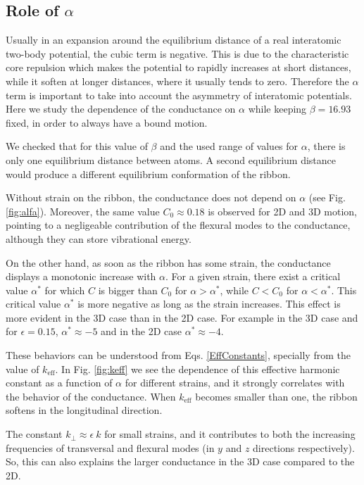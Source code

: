 \documentclass[12pt]{article}
\begin{document}
\subsection*{\textbf{Role of $\alpha$}}

Usually in an expansion around the equilibrium distance of a real interatomic two-body potential, the cubic term is negative. This is due to the characteristic core repulsion which makes the potential to rapidly increases at short distances, while it soften at longer distances, where it usually tends to zero. Therefore the $\alpha$ term is important to take into account the asymmetry of interatomic potentials. Here we study the dependence of the conductance on $\alpha$ while keeping $\beta = 16.93$ fixed, in order to always have a bound motion.

We checked that for this value of $\beta$ and the used range of values for $\alpha$, there is only one equilibrium distance between atoms. A second equilibrium distance would produce a different equilibrium conformation of the ribbon.

Without strain on the ribbon, the conductance does not depend on $\alpha$ (see Fig.\ref{fig:alfa}). Moreover, the same value $C_0 \approx 0.18$ is observed for 2D and 3D motion, pointing to a negligeable contribution of the flexural modes to the conductance, although they can store vibrational energy.

On the other hand, as soon as the ribbon has some strain, the conductance displays a monotonic increase with $\alpha$. For a given strain, there exist a critical value $\alpha^*$ for which $C$ is bigger than $C_0$ for $\alpha > \alpha^*$, while $C < C_0$ for $\alpha < \alpha^*$. This critical value $\alpha^*$ is more negative as long as the strain increases. This effect is more evident in the 3D case than in the 2D case. For example in the 3D case and for $\epsilon = 0.15$, $\alpha^* \approx -5 $ and in the 2D case $\alpha^* \approx -4 $.



These behaviors can be understood from Eqs. \ref{EffConstants}, specially from the value of $k_{\text{eff}}$. In Fig. \ref{fig:keff} we see the dependence of this effective harmonic constant as a function of $\alpha$ for different strains, and it strongly correlates with the behavior of the conductance. When $k_{\text{eff}}$ becomes smaller than one, the ribbon softens in the longitudinal direction.

The constant $k_{\perp} \approx \epsilon \ k $ for small strains, and it contributes to both the increasing frequencies of transversal and flexural modes (in $y$ and $z$ directions respectively). So, this can also explains the larger conductance in the 3D case compared to the 2D.
\end{document}
